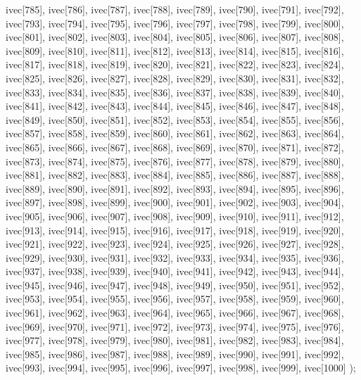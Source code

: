 \begin{DoxyCode}
{  ivec[785],
  ivec[786],
  ivec[787],
  ivec[788],
  ivec[789],
  ivec[790],
  ivec[791],
  ivec[792],
  ivec[793],
  ivec[794],
  ivec[795],
  ivec[796],
  ivec[797],
  ivec[798],
  ivec[799],
  ivec[800],
  ivec[801],
  ivec[802],
  ivec[803],
  ivec[804],
  ivec[805],
  ivec[806],
  ivec[807],
  ivec[808],
  ivec[809],
  ivec[810],
  ivec[811],
  ivec[812],
  ivec[813],
  ivec[814],
  ivec[815],
  ivec[816],
  ivec[817],
  ivec[818],
  ivec[819],
  ivec[820],
  ivec[821],
  ivec[822],
  ivec[823],
  ivec[824],
  ivec[825],
  ivec[826],
  ivec[827],
  ivec[828],
  ivec[829],
  ivec[830],
  ivec[831],
  ivec[832],
  ivec[833],
  ivec[834],
  ivec[835],
  ivec[836],
  ivec[837],
  ivec[838],
  ivec[839],
  ivec[840],
  ivec[841],
  ivec[842],
  ivec[843],
  ivec[844],
  ivec[845],
  ivec[846],
  ivec[847],
  ivec[848],
  ivec[849],
  ivec[850],
  ivec[851],
  ivec[852],
  ivec[853],
  ivec[854],
  ivec[855],
  ivec[856],
  ivec[857],
  ivec[858],
  ivec[859],
  ivec[860],
  ivec[861],
  ivec[862],
  ivec[863],
  ivec[864],
  ivec[865],
  ivec[866],
  ivec[867],
  ivec[868],
  ivec[869],
  ivec[870],
  ivec[871],
  ivec[872],
  ivec[873],
  ivec[874],
  ivec[875],
  ivec[876],
  ivec[877],
  ivec[878],
  ivec[879],
  ivec[880],
  ivec[881],
  ivec[882],
  ivec[883],
  ivec[884],
  ivec[885],
  ivec[886],
  ivec[887],
  ivec[888],
  ivec[889],
  ivec[890],
  ivec[891],
  ivec[892],
  ivec[893],
  ivec[894],
  ivec[895],
  ivec[896],
  ivec[897],
  ivec[898],
  ivec[899],
  ivec[900],
  ivec[901],
  ivec[902],
  ivec[903],
  ivec[904],
  ivec[905],
  ivec[906],
  ivec[907],
  ivec[908],
  ivec[909],
  ivec[910],
  ivec[911],
  ivec[912],
  ivec[913],
  ivec[914],
  ivec[915],
  ivec[916],
  ivec[917],
  ivec[918],
  ivec[919],
  ivec[920],
  ivec[921],
  ivec[922],
  ivec[923],
  ivec[924],
  ivec[925],
  ivec[926],
  ivec[927],
  ivec[928],
  ivec[929],
  ivec[930],
  ivec[931],
  ivec[932],
  ivec[933],
  ivec[934],
  ivec[935],
  ivec[936],
  ivec[937],
  ivec[938],
  ivec[939],
  ivec[940],
  ivec[941],
  ivec[942],
  ivec[943],
  ivec[944],
  ivec[945],
  ivec[946],
  ivec[947],
  ivec[948],
  ivec[949],
  ivec[950],
  ivec[951],
  ivec[952],
  ivec[953],
  ivec[954],
  ivec[955],
  ivec[956],
  ivec[957],
  ivec[958],
  ivec[959],
  ivec[960],
  ivec[961],
  ivec[962],
  ivec[963],
  ivec[964],
  ivec[965],
  ivec[966],
  ivec[967],
  ivec[968],
  ivec[969],
  ivec[970],
  ivec[971],
  ivec[972],
  ivec[973],
  ivec[974],
  ivec[975],
  ivec[976],
  ivec[977],
  ivec[978],
  ivec[979],
  ivec[980],
  ivec[981],
  ivec[982],
  ivec[983],
  ivec[984],
  ivec[985],
  ivec[986],
  ivec[987],
  ivec[988],
  ivec[989],
  ivec[990],
  ivec[991],
  ivec[992],
  ivec[993],
  ivec[994],
  ivec[995],
  ivec[996],
  ivec[997],
  ivec[998],
  ivec[999],
  ivec[1000]
  );
}
\end{DoxyCode}
